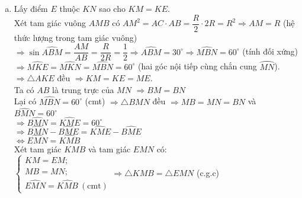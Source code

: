 \begin{ex}
{\begin{enumerate}[a)]
		$\Rightarrow \triangle AMN$ cân tại $A$. Suy ra $AM=AN$\\
		$\Rightarrow \textrm{sđ}\wideparen{AM}=\textrm{sđ}\wideparen{AN}$.\\
		$\Rightarrow \widehat{AMN}=\widehat{AKM}$ (hai góc nội tiếp chắn hai cung bằng nhau)\\
		Xét tam giác $AMN$ và $AKM$ có: $\begin{cases}
		\widehat{MAK}\:\text{chung}\\
		\widehat{AMN}=\widehat{AKM}\quad (\text{chứng minh trên})
		\end{cases}$\\
		$\Rightarrow \triangle AMH\backsim \triangle AKM$ (g.g)\\
		$\Rightarrow \dfrac{AM}{AK}=\dfrac{AH}{AM}\Rightarrow AM^2=AH\cdot AK$.
		\item Lấy điểm $E$ thuộc $KN$ sao cho $KM=KE$.\\
		Xét tam giác vuông $AMB$ có $AM^2=AC\cdot AB=\dfrac{R}{2}\cdot2R=R^2\Rightarrow AM=R$ (hệ thức lượng trong tam giác vuông)\\
		$\Rightarrow \sin\widehat{ABM}=\dfrac{AM}{AB}=\dfrac{R}{2R}=\dfrac{1}{2}\Rightarrow \widehat{ABM}=30^{\circ}\Rightarrow \widehat{MBN}=60^{\circ}$ (tính đối xứng)\\
		$\Rightarrow \widehat{MKE}=\widehat{MKN}=\widehat{MBN}=60^{\circ}$ (hai góc nội tiếp cùng chắn cung $\wideparen{MN}$).\\
		$\Rightarrow \triangle AKE$ đều $\Rightarrow KM=KE=ME$.\\
		Ta có $AB$ là trung trực của $MN$ $\Rightarrow BM=BN$\\
		Lại có $\widehat{MBN}=60^{\circ}$ (cmt) $\Rightarrow\triangle BMN$ đều $\Rightarrow MB=MN=BN$ và $\widehat{BMN}=60^{\circ}$\\
		$\Rightarrow \widehat{BMN}=\widehat{KME}=60^{\circ}$\\
		$\Rightarrow \widehat{BMN}-\widehat{BME}=\widehat{KME}-\widehat{BME}$\\
		$\Leftrightarrow \widehat{EMN}=\widehat{KMB}$\\
		Xét tam giác $KMB$ và tam giác $EMN$ có:\\
		$\begin{cases}
		KM=EM;\\
		MB=MN;\\
		\widehat{EMN}=\widehat{KMB}\:(\textrm{cmt})
		\end{cases}\Rightarrow \triangle KMB=\triangle EMN$ (c.g.c)\\

\end{enumerate}}
\end{ex}
